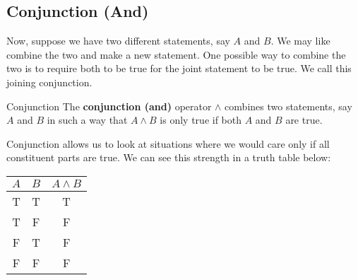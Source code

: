 \subsection{Conjunction (And)}

Now, suppose we have two different statements, say $A$ and $B$.
We may like combine the two and make a new statement.
One possible way to combine the two is to require both to be true for the joint statement to be true.
We call this joining conjunction.

\begin{defn}{Conjunction}
  The \textbf{conjunction (and)} operator $\land$ combines two statements, say $A$ and $B$ in such a way that $A\land B$ is only true if both $A$ and $B$ are true. 
\end{defn}

Conjunction allows us to look at situations where we would care only if all constituent parts are true.
We can see this strength in a truth table below:

\begin{minipage}{\linewidth}
  \centering
  \begin{tabular}{ccc}
    $A$ & $B$ & $A \land B$ \\
    \toprule
    T & T & T \\
    T & F & F \\
    F & T & F \\
    F & F & F \\
  \end{tabular}
  \label{tab:conjunction} 
\end{minipage}

